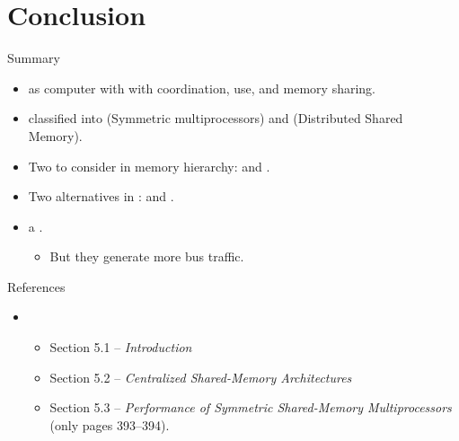 \section{Conclusion}

\begin{frame}[t]{Summary}
\begin{itemize}
  \item {} as computer with  with
        coordination, use, and memory sharing.

  \item {} classified into 
         (Symmetric multiprocessors) and
         (Distributed Shared Memory).

  \item Two  to consider in memory hierarchy: 
         and .

  \item Two alternatives in : 
         and .

  \item {}  a .
    \begin{itemize}
      \item But they generate more bus traffic.
    \end{itemize}
\end{itemize}
\end{frame}


\begin{frame}[t]{References}
\begin{itemize}
  \item \bibhennessy
    \begin{itemize}
      \item Section 5.1 -- \emph{Introduction}
      \item Section 5.2 -- \emph{Centralized Shared-Memory Architectures}
      \item Section 5.3 -- \emph{Performance of Symmetric Shared-Memory Multiprocessors}
            (only pages 393--394).
    \end{itemize}

\end{itemize}
\end{frame}
